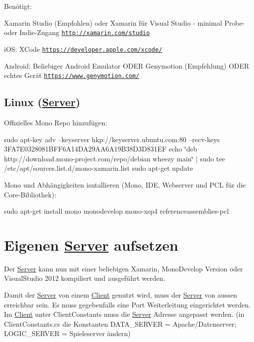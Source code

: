 Benötigt\+:
\begin{DoxyItemize}
\item Xamarin Studio (Empfohlen) oder Xamarin für Visual Studio -\/ minimal Probe-\/ oder Indie-\/\+Zugang \href{http://xamarin.com/studio}{\tt http\+://xamarin.\+com/studio}
\item i\+O\+S\+: X\+Code \href{https://developer.apple.com/xcode/}{\tt https\+://developer.\+apple.\+com/xcode/}
\item Android\+: Beliebiger Android Emulator O\+D\+E\+R Genymotion (Empfehlung) O\+D\+E\+R echtes Gerät \href{https://www.genymotion.com/}{\tt https\+://www.\+genymotion.\+com/}
\end{DoxyItemize}

\subsection*{Linux (\hyperlink{namespaceServer}{Server})}

Offizielles Mono Repo hinzufügen\+:

sudo apt-\/key adv --keyserver hkp\+://keyserver.ubuntu.\+com\+:80 --recv-\/keys 3\+F\+A7\+E0328081\+B\+F\+F6\+A14\+D\+A29\+A\+A6\+A19\+B38\+D3\+D831\+E\+F echo \char`\"{}deb http\+://download.\+mono-\/project.\+com/repo/debian wheezy main\char`\"{} $\vert$ sudo tee /etc/apt/sources.list.\+d/mono-\/xamarin.list sudo apt-\/get update

Mono und Abhängigkeiten isntallieren (Mono, I\+D\+E, Webserver und P\+C\+L für die Core-\/\+Bibliothek)\+:

sudo apt-\/get install mono monodevelop mono-\/xsp4 referenceassemblies-\/pcl

\section*{Eigenen \hyperlink{namespaceServer}{Server} aufsetzen}

Der \hyperlink{namespaceServer}{Server} kann nun mit einer beliebigen Xamarin, Mono\+Develop Version oder Visual\+Studio 2012 kompiliert und ausgeführt werden.

Damit der \hyperlink{namespaceServer}{Server} von einem \hyperlink{namespaceClient}{Client} genutzt wird, muss der \hyperlink{namespaceServer}{Server} von aussen erreichbar sein. Es muss gegebenfalls eine Port Weiterleitung eingerichtet werden. Im \hyperlink{namespaceClient}{Client} unter Client\+Constants muss die \hyperlink{namespaceServer}{Server} Adresse angepasst werden. (in Client\+Constants.\+cs die Konstanten D\+A\+T\+A\+\_\+\+S\+E\+R\+V\+E\+R = Apache/\+Datenserver; L\+O\+G\+I\+C\+\_\+\+S\+E\+R\+V\+E\+R = Spieleserver ändern)

